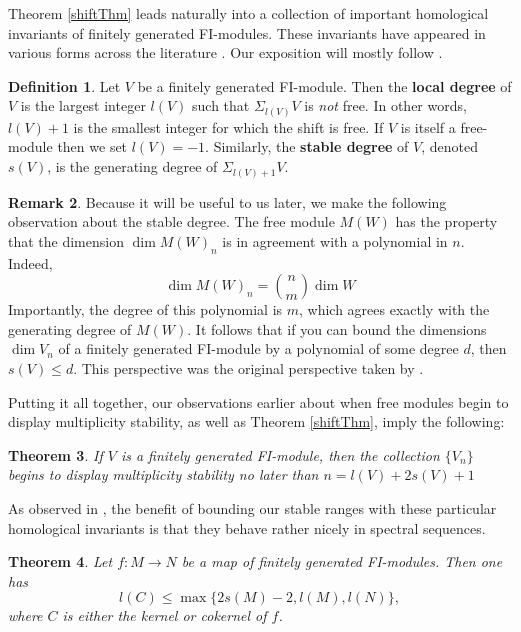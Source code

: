 \documentclass[12pt]{amsart}
\newtheorem{thm}{Theorem}[section]
\theoremstyle{definition}
\newtheorem{defn}[thm]{Definition}
\newtheorem{rmk}[thm]{Remark}
\begin{document}
Theorem \ref{shiftThm} leads naturally into a collection of important homological invariants of finitely generated FI-modules. These invariants have appeared in various forms across the literature \cite{CEF,CEFN,CMNR,LR,R}. Our exposition will mostly follow \cite{CMNR}.

\begin{defn}
    Let $V$ be a finitely generated FI-module. Then the \textbf{local degree} of $V$ is the largest integer $l(V)$ such that $\Sigma_{l(V)}V$ is \emph{not} free. In other words, $l(V)+1$ is the smallest integer for which the shift is free. If $V$ is itself a free-module then we set $l(V) = -1$. Similarly, the \textbf{stable degree} of $V$, denoted $s(V)$, is the generating degree of $\Sigma_{l(V)+1}V$.
\end{defn}

\begin{rmk}
    Because it will be useful to us later, we make the following observation about the stable degree. The free module $M(W)$ has the property that the dimension $\dim M(W)_n$ is in agreement with a polynomial in $n$. Indeed,
    \[
    \dim M(W)_n = \binom{n}{m}\dim W
    \]
    Importantly, the degree of this polynomial is $m$, which agrees exactly with the generating degree of $M(W)$. It follows that if you can bound the dimensions $\dim V_n$ of a finitely generated FI-module by a polynomial of some degree $d$, then $s(V) \leq d$. This perspective was the original perspective taken by \cite{CMNR}.
\end{rmk}

Putting it all together, our observations earlier about when free modules begin to display multiplicity stability, as well as Theorem \ref{shiftThm}, imply the following:

\begin{thm}
    If $V$ is a finitely generated FI-module, then the collection $\{V_n\}$ begins to display multiplicity stability no later than $n = l(V)+2s(V) + 1$
\end{thm}

As observed in \cite{CMNR}, the benefit of bounding our stable ranges with these particular homological invariants is that they behave rather nicely in spectral sequences. 

\begin{thm}\cite[Proposition 3.3]{CMNR}\label{technicalbound}
Let $f:M \rightarrow N$ be a map of finitely generated FI-modules. Then one has
\[
l(C) \leq \max\{2s(M)-2,l(M),l(N)\},
\]
where $C$ is either the kernel or cokernel of $f$.
\end{thm}
\end{document}
